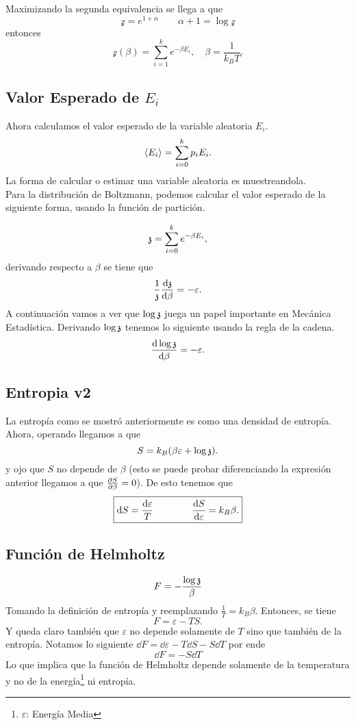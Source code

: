 Maximizando la segunda equivalencia se llega a que
	$$ \mathcal{z} = e^{1 + \alpha} \qquad \alpha + 1 = \log{\mathcal{z}} $$
entonces 
	$$ \boxed{ \mathcal{z} (\beta) = \sum _{i=1} ^k e^{-\beta E_i}, \quad \beta = \frac{1}{k_B T}. } $$


\subsection{Valor Esperado de $E_i$}
Ahora calculamos el valor esperado de la variable aleatoria $E_i$.
    $$ \expval{E_i} = \sum _{i=0} ^k p_i E_i . $$
La forma de calcular o estimar una variable aleatoria es muestreandola. \\

Para la distribución de Boltzmann, podemos calcular el valor esperado de la siguiente forma, usando la función de partición.

    $$ \mathfrak{z} = \sum _{i=0} ^k e^{-\beta E_i},  $$
derivando respecto a $\beta$ se tiene que
    $$ \frac{1}{\mathfrak{z}} \dv{\mathfrak{z}}{\beta} = -\varepsilon . $$
A continuación vamos a ver que $\log{\mathfrak{z}}$ juega un papel importante en Mecánica Estadística. Derivando $\log{\mathfrak{z}}$ tenemos lo siguiente usando la regla de la cadena.
    $$ \dv{\log{\mathfrak{z}}}{\beta} = -\varepsilon . $$


\subsection{Entropia v2}
La entropía como se mostró anteriormente es como una densidad de entropía. Ahora, operando llegamos a que
    $$ S =  k_B \qty(\beta \varepsilon + \log{\mathfrak{z}}). $$
y ojo que $S$ no depende de $\beta$ (esto se puede probar diferenciando la expresión anterior llegamos a que $\pdv{S}{\beta} = 0$). De esto tenemos que
    $$ \boxed{ \dd{S} = \frac{\dd{\varepsilon}}{T} \qquad \qquad \dv{S}{\varepsilon} = k_B \beta . } $$

\subsection{Función de Helmholtz}
    $$ F = - \frac{\log{\mathfrak{z}}}{\beta} $$
Tomando la definición de entropía y reemplazando $\frac{1}{T} = k_B \beta$. Entonces, se tiene
    $$ F = \varepsilon - TS. $$
Y queda claro también que $\varepsilon$ no depende solamente de $T$ sino que  también de la entropía. Notamos lo siguiente $\dd{F} = \dd{\varepsilon} - T\dd{S} - S\dd{T}$ por ende
    $$ \dd{F} = -S\dd{T} $$
Lo que implica que la función de Helmholtz depende solamente de la temperatura y no de la energía\footnote{$\varepsilon$: Energía Media} ni entropía.

